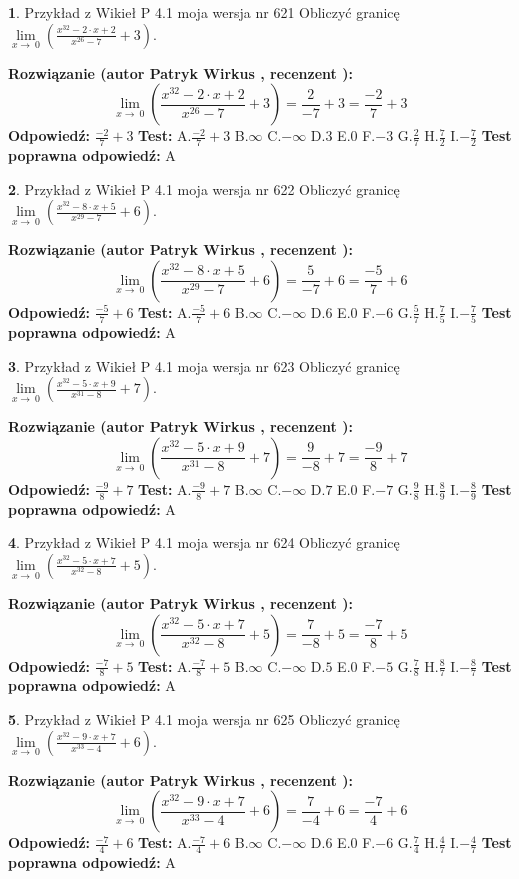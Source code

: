 \documentclass[12pt, a4paper]{article}
\theoremstyle{definition} %
\newtheorem{zad}{}
\newcommand{\zadStart}[1]{\begin{zad}#1\newline}
\newcommand{\zadStop}{\end{zad}}
\newcommand{\rozwStart}[2]{\noindent \textbf{Rozwiązanie (autor #1 , recenzent #2): }\newline}
\newcommand{\rozwStop}{\newline}
\newcommand{\odpStart}{\noindent \textbf{Odpowiedź:}\newline}
\newcommand{\odpStop}{\newline}
\newcommand{\testStart}{\noindent \textbf{Test:}\newline}
\newcommand{\testStop}{\newline}
\newcommand{\kluczStart}{\noindent \textbf{Test poprawna odpowiedź:}\newline}
\newcommand{\kluczStop}{\newline}
\begin{document}
\zadStart{Przykład z Wikieł P 4.1 moja wersja nr 621}
Obliczyć granicę $\lim\limits_{x\to\ 0}(\frac{x^{32}-2 \cdot x +2}{x^{26}-7}+3)$.
\zadStop
\rozwStart{Patryk Wirkus}{}
$$\lim\limits_{x\to\ 0}(\frac{x^{32}-2 \cdot x +2}{x^{26}-7}+3)=\frac{2}{-7}+3=\frac{-2}{7}+3$$
\rozwStop
\odpStart
$\frac{-2}{7}+3$
\odpStop
\testStart
A.$\frac{-2}{7}+3$
B.$\infty$
C.$-\infty$
D.$3$
E.$0$
F.$-3$
G.$\frac{2}{7}$
H.$\frac{7}{2}$
I.$-\frac{7}{2}$
\testStop
\kluczStart
A
\kluczStop



\zadStart{Przykład z Wikieł P 4.1 moja wersja nr 622}
Obliczyć granicę $\lim\limits_{x\to\ 0}(\frac{x^{32}-8 \cdot x +5}{x^{29}-7}+6)$.
\zadStop
\rozwStart{Patryk Wirkus}{}
$$\lim\limits_{x\to\ 0}(\frac{x^{32}-8 \cdot x +5}{x^{29}-7}+6)=\frac{5}{-7}+6=\frac{-5}{7}+6$$
\rozwStop
\odpStart
$\frac{-5}{7}+6$
\odpStop
\testStart
A.$\frac{-5}{7}+6$
B.$\infty$
C.$-\infty$
D.$6$
E.$0$
F.$-6$
G.$\frac{5}{7}$
H.$\frac{7}{5}$
I.$-\frac{7}{5}$
\testStop
\kluczStart
A
\kluczStop



\zadStart{Przykład z Wikieł P 4.1 moja wersja nr 623}
Obliczyć granicę $\lim\limits_{x\to\ 0}(\frac{x^{32}-5 \cdot x +9}{x^{31}-8}+7)$.
\zadStop
\rozwStart{Patryk Wirkus}{}
$$\lim\limits_{x\to\ 0}(\frac{x^{32}-5 \cdot x +9}{x^{31}-8}+7)=\frac{9}{-8}+7=\frac{-9}{8}+7$$
\rozwStop
\odpStart
$\frac{-9}{8}+7$
\odpStop
\testStart
A.$\frac{-9}{8}+7$
B.$\infty$
C.$-\infty$
D.$7$
E.$0$
F.$-7$
G.$\frac{9}{8}$
H.$\frac{8}{9}$
I.$-\frac{8}{9}$
\testStop
\kluczStart
A
\kluczStop



\zadStart{Przykład z Wikieł P 4.1 moja wersja nr 624}
Obliczyć granicę $\lim\limits_{x\to\ 0}(\frac{x^{32}-5 \cdot x +7}{x^{32}-8}+5)$.
\zadStop
\rozwStart{Patryk Wirkus}{}
$$\lim\limits_{x\to\ 0}(\frac{x^{32}-5 \cdot x +7}{x^{32}-8}+5)=\frac{7}{-8}+5=\frac{-7}{8}+5$$
\rozwStop
\odpStart
$\frac{-7}{8}+5$
\odpStop
\testStart
A.$\frac{-7}{8}+5$
B.$\infty$
C.$-\infty$
D.$5$
E.$0$
F.$-5$
G.$\frac{7}{8}$
H.$\frac{8}{7}$
I.$-\frac{8}{7}$
\testStop
\kluczStart
A
\kluczStop



\zadStart{Przykład z Wikieł P 4.1 moja wersja nr 625}
Obliczyć granicę $\lim\limits_{x\to\ 0}(\frac{x^{32}-9 \cdot x +7}{x^{33}-4}+6)$.
\zadStop
\rozwStart{Patryk Wirkus}{}
$$\lim\limits_{x\to\ 0}(\frac{x^{32}-9 \cdot x +7}{x^{33}-4}+6)=\frac{7}{-4}+6=\frac{-7}{4}+6$$
\rozwStop
\odpStart
$\frac{-7}{4}+6$
\odpStop
\testStart
A.$\frac{-7}{4}+6$
B.$\infty$
C.$-\infty$
D.$6$
E.$0$
F.$-6$
G.$\frac{7}{4}$
H.$\frac{4}{7}$
I.$-\frac{4}{7}$
\testStop
\kluczStart
A
\kluczStop
\end{document}

